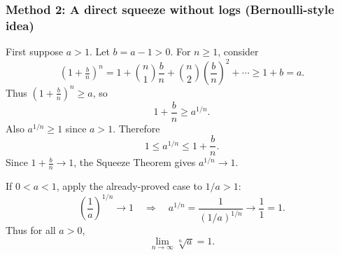 \documentclass[12pt]{article}
\begin{document}
\subsubsection*{Method 2: A direct squeeze without logs (Bernoulli-style idea)}

First suppose \(a>1\). Let \(b=a-1>0\). For \(n\ge 1\), consider
\[
(1+\tfrac{b}{n})^{n}
=1+\binom{n}{1}\frac{b}{n}+\binom{n}{2}\left(\frac{b}{n}\right)^{2}+\cdots
\ge 1+b=a.
\]
Thus \((1+\tfrac{b}{n})^{n}\ge a\), so
\[
1+\frac{b}{n}\ge a^{1/n}.
\]
Also \(a^{1/n}\ge 1\) since \(a>1\). Therefore
\[
1\le a^{1/n}\le 1+\frac{b}{n}.
\]
Since \(1+\frac{b}{n}\to 1\), the Squeeze Theorem gives \(a^{1/n}\to 1\).

If \(0<a<1\), apply the already-proved case to \(1/a>1\):
\[
\left(\frac{1}{a}\right)^{1/n}\to 1
\quad\Rightarrow\quad
a^{1/n}=\frac{1}{(1/a)^{1/n}}\to \frac{1}{1}=1.
\]
Thus for all \(a>0\),
\[
\boxed{\lim_{n\to\infty}\sqrt[n]{a}=1.}
\]
\end{document}
